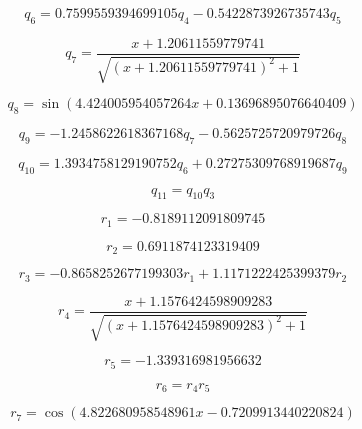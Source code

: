 \begin{equation}
q_{6}=0.7599559394699105 q_{4} - 0.5422873926735743 q_{5}
\end{equation}


\begin{equation}
q_{7}=\frac{x + 1.20611559779741}{\sqrt{\left(x + 1.20611559779741\right)^{2} + 1}}
\end{equation}


\begin{equation}
q_{8}=\sin{\left(4.424005954057264 x + 0.13696895076640409 \right)}
\end{equation}


\begin{equation}
q_{9}=- 1.2458622618367168 q_{7} - 0.5625725720979726 q_{8}
\end{equation}


\begin{equation}
q_{10}=1.3934758129190752 q_{6} + 0.27275309768919687 q_{9}
\end{equation}


\begin{equation}
q_{11}=q_{10} q_{3}
\end{equation}


\begin{equation}
r_{1}=-0.8189112091809745
\end{equation}


\begin{equation}
r_{2}=0.6911874123319409
\end{equation}


\begin{equation}
r_{3}=- 0.8658252677199303 r_{1} + 1.1171222425399379 r_{2}
\end{equation}


\begin{equation}
r_{4}=\frac{x + 1.1576424598909283}{\sqrt{\left(x + 1.1576424598909283\right)^{2} + 1}}
\end{equation}


\begin{equation}
r_{5}=-1.339316981956632
\end{equation}


\begin{equation}
r_{6}=r_{4} r_{5}
\end{equation}


\begin{equation}
r_{7}=\cos{\left(4.822680958548961 x - 0.7209913440220824 \right)}
\end{equation}


